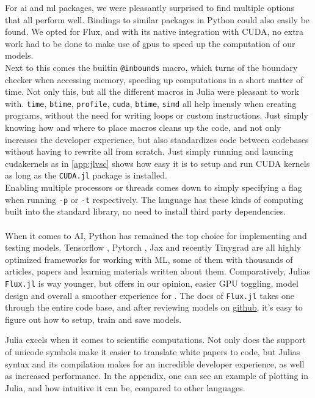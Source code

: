  For \acrshort{ai} and \acrshort{ml} packages, we were pleasantly surprised to find multiple options that all perform well. Bindings to similar packages in Python could also easily be found. We opted for Flux, and with its native integration with CUDA, no extra work had to be done to make use of \acrshort{gpu}s to speed up the computation of our models. \\

Next to this comes the builtin \texttt{@inbounds} macro, which turns of the boundary checker when accessing memory, speeding up computations in a short matter of time. Not only this, but all the different macros in Julia were pleasant to work with. \texttt{time}, \texttt{btime}, \texttt{profile}, \texttt{cuda}, \texttt{btime}, \texttt{simd} all help imensly when creating programs, without the need for writing loops or custom instructions. Just simply knowing how and where to place macros cleans up the code, and not only increases the developer experience, but also standardizes code between codebases without having to rewrite all from scratch. Just simply running and launcing cudakernels as in \ref{app:jlvsc} shows how easy it is to setup and run CUDA kernels as long as the \texttt{CUDA.jl} package is installed. \\

Enabling multiple processors or threads comes down to simply specifying a flag when running \texttt{-p} or \texttt{-t} respectively. The language has these kinds of computing built into the standard library, no need to install third party dependencies. \\ \\

When it comes to AI, Python has remained the top choice for implementing and testing models. Tensorflow \cite{abadi2016tensorflow}, Pytorch \cite{paszke2019pytorch}, Jax \cite{47008} and recently Tinygrad \cite{tinygrad} are all highly optimized frameworks for working with ML, some of them with thousands of articles, papers and learning materials written about them. Comparatively, Julias \texttt{Flux.jl} is way younger, but offers in our opinion, easier GPU toggling, model design and overall a smoother experience for . The docs of \texttt{Flux.jl} takes one through the entire code base, and after reviewing models on \href{https://github.com/FluxML/model-zoo}{github}, it's easy to figure out how to setup, train and save models.

Julia excels when it comes to scientific computations. Not only does the support of unicode symbols make it easier to translate white papers to code, but Julias syntax and its compilation makes for an incredible developer experience, as well as increased performance. In the appendix, one can see an example of plotting in Julia, and how intuitive it can be, compared to other languages. \\

